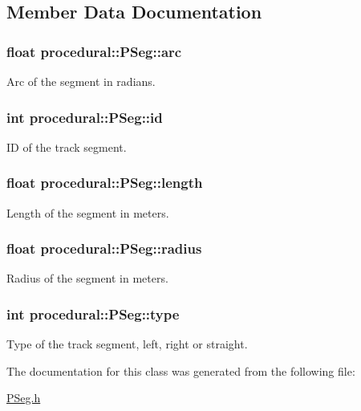 \subsection{Member Data Documentation}
\hypertarget{classprocedural_1_1_p_seg_a6dbb96b2dc041e44b62f519f88c39fd4}{
\subsubsection[{arc}]{\setlength{\rightskip}{0pt plus 5cm}float procedural\-::\-P\-Seg\-::arc}}\label{classprocedural_1_1_p_seg_a6dbb96b2dc041e44b62f519f88c39fd4}
Arc of the segment in radians. \hypertarget{classprocedural_1_1_p_seg_ad1524e67c78c9efda387d8207b085b4b}{
\subsubsection[{id}]{\setlength{\rightskip}{0pt plus 5cm}int procedural\-::\-P\-Seg\-::id}}\label{classprocedural_1_1_p_seg_ad1524e67c78c9efda387d8207b085b4b}
I\-D of the track segment. \hypertarget{classprocedural_1_1_p_seg_a48e7abd7a4ecb5881e8db43ee9ed1353}{
\subsubsection[{length}]{\setlength{\rightskip}{0pt plus 5cm}float procedural\-::\-P\-Seg\-::length}}\label{classprocedural_1_1_p_seg_a48e7abd7a4ecb5881e8db43ee9ed1353}
Length of the segment in meters. \hypertarget{classprocedural_1_1_p_seg_ad1c1317a1c5e49cbb57ec0c752de4dea}{
\subsubsection[{radius}]{\setlength{\rightskip}{0pt plus 5cm}float procedural\-::\-P\-Seg\-::radius}}\label{classprocedural_1_1_p_seg_ad1c1317a1c5e49cbb57ec0c752de4dea}
Radius of the segment in meters. \hypertarget{classprocedural_1_1_p_seg_ac083c27ad9a4026bef178c04f5df7360}{
\subsubsection[{type}]{\setlength{\rightskip}{0pt plus 5cm}int procedural\-::\-P\-Seg\-::type}}\label{classprocedural_1_1_p_seg_ac083c27ad9a4026bef178c04f5df7360}
Type of the track segment, left, right or straight. 

The documentation for this class was generated from the following file\-:\begin{DoxyCompactItemize}
\item 
\hyperlink{_p_seg_8h}{P\-Seg.\-h}\end{DoxyCompactItemize}
